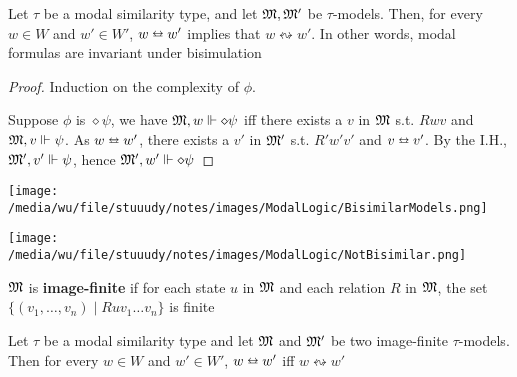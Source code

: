 \documentclass[11pt]{article}
\begin{document}
\begin{theorem}[]
\label{thm2.20}
Let \(\tau\) be a modal similarity type, and let \(\mathfrak{M}, \mathfrak{M}'\) be \(\tau\)-models.
Then, for every \(w\in W\) and \(w'\in W'\), \(w\leftrightarroweq w'\)
implies that \(w\leftrightsquigarrow w'\). In other words, modal formulas are
invariant under bisimulation
\end{theorem}

\begin{proof}
Induction on the complexity of \(\phi\).

Suppose \(\phi\) is \(\diamond\psi\), we have \(\mathfrak{M},w\Vdash\diamond\psi\) iff there
exists a \(v\) in \(\mathfrak{M}\) s.t. \(Rwv\) and \(\mathfrak{M},v\Vdash\psi\). As
\(w\leftrightarroweq w'\), there exists a \(v'\) in \(\mathfrak{M}'\) s.t. \(R'w'v'\)
and \(v\leftrightarroweq v'\). By the I.H., \(\mathfrak{M}',v'\Vdash\psi\), hence \(\mathfrak{M}',w'\Vdash\diamond\psi\)
\end{proof}

\begin{examplle}
\label{example2.22}

\begin{center}
\texttt{[image: /media/wu/file/stuuudy/notes/images/ModalLogic/BisimilarModels.png]}
\end{center}
\end{examplle}

\begin{examplle}[]
\label{example2.23}

\begin{center}
\texttt{[image: /media/wu/file/stuuudy/notes/images/ModalLogic/NotBisimilar.png]}
\end{center}
\end{examplle}

\(\mathfrak{M}\) is \textbf{image-finite} if for each state \(u\) in \(\mathfrak{M}\) and each relation
\(R\) in \(\mathfrak{M}\), the set \(\{(v_1,\dots,v_n)\mid Ruv_1\dots v_n\}\) is
finite

\begin{theorem}
\label{thm2.24}
Let \(\tau\) be a modal similarity type and let \(\mathfrak{M}\) and \(\mathfrak{M}'\) be two
image-finite \(\tau\)-models. Then for every \(w\in W\) and \(w'\in W'\),
\(w\leftrightarroweq w'\) iff \(w\leftrightsquigarrow w'\)
\end{theorem}
\end{document}
